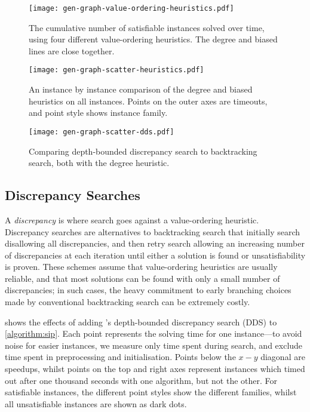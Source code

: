 \documentclass{article}
\newcommand{\citep}[1]{\cite{#1}}
\newcommand{\citepos}[1]{\citeauthor{#1}'s \shortcite{#1}}
\begin{document}
\begin{figure}[p]
    \centering
    \texttt{[image: gen-graph-value-ordering-heuristics.pdf]}

    \caption{The cumulative number of satisfiable instances solved over time, using four
    different value-ordering heuristics. The degree and biased lines are close together.}
    \label{figure:value-ordering-heuristics}
\end{figure}

\begin{figure}[p]
    \centering
    \texttt{[image: gen-graph-scatter-heuristics.pdf]}

    \caption{An instance by instance comparison of the degree and biased heuristics on all
    instances. Points on the outer axes are timeouts, and point style shows instance family.}
    \label{figure:scatter-heuristics}
\end{figure}

\begin{figure}[p]
    \centering
    \texttt{[image: gen-graph-scatter-dds.pdf]}

    \caption{Comparing depth-bounded discrepancy search to backtracking search, both with the degree
    heuristic.}\label{figure:scatter-dds}
\end{figure}

\subsection{Discrepancy Searches}

A \emph{discrepancy} is where search goes against a value-ordering heuristic.  Discrepancy searches
\citep{DBLP:conf/ijcai/HarveyG95,DBLP:conf/aaai/Korf96,DBLP:conf/ijcai/Walsh97} are alternatives to
backtracking search that initially search disallowing all discrepancies, and then retry search
allowing an increasing number of discrepancies at each iteration until either a solution is found or
unsatisfiability is proven. These schemes assume that value-ordering heuristics are usually
reliable, and that most solutions can be found with only a small number of discrepancies; in such
cases, the heavy commitment to early branching choices made by conventional backtracking search can
be extremely costly.

 shows the effects of adding \citepos{DBLP:conf/ijcai/Walsh97}
depth-bounded discrepancy search (DDS) to \cref{algorithm:sip}. Each point represents the solving
time for one instance---to avoid noise for easier instances, we measure only time spent during
search, and exclude time spent in preprocessing and initialisation.  Points below the $x-y$ diagonal
are speedups, whilst points on the top and right axes represent instances which timed out after one
thousand seconds with one algorithm, but not the other. For satisfiable instances, the different
point styles show the different families, whilst all unsatisfiable instances are shown as dark dots.
\end{document}
